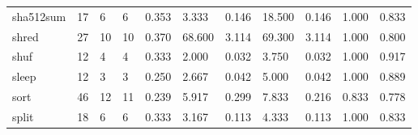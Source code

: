 \begin{longtable}{lp{1.8cm}p{1.8cm}p{1.8cm}p{1.8cm}p{1.8cm}p{1.8cm}p{1.8cm}p{1.8cm}p{1.8cm}p{1.8cm}}
sha512sum &                           17 &                  6 &                                 6 &                                      0.353 &                                  3.333 &                                        0.146 &                            18.500 &                                   0.146 &                              1.000 &                                              0.833 \\
shred     &                           27 &                 10 &                                10 &                                      0.370 &                                 68.600 &                                        3.114 &                            69.300 &                                   3.114 &                              1.000 &                                              0.800 \\
shuf      &                           12 &                  4 &                                 4 &                                      0.333 &                                  2.000 &                                        0.032 &                             3.750 &                                   0.032 &                              1.000 &                                              0.917 \\
sleep     &                           12 &                  3 &                                 3 &                                      0.250 &                                  2.667 &                                        0.042 &                             5.000 &                                   0.042 &                              1.000 &                                              0.889 \\
sort      &                           46 &                 12 &                                11 &                                      0.239 &                                  5.917 &                                        0.299 &                             7.833 &                                   0.216 &                              0.833 &                                              0.778 \\
split     &                           18 &                  6 &                                 6 &                                      0.333 &                                  3.167 &                                        0.113 &                             4.333 &                                   0.113 &                              1.000 &                                              0.833 \\

\end{longtable}
